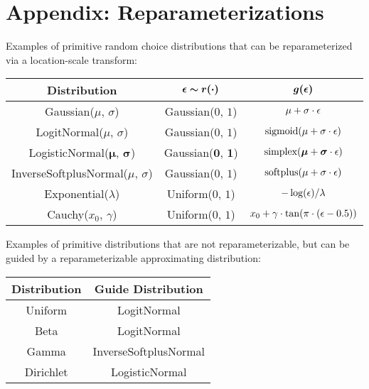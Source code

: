 \section{Appendix: Reparameterizations}
\label{sec:appendix_reparam}

Examples of primitive random choice distributions that can be reparameterized via a location-scale transform:

\begin{center}
\renewcommand{\arraystretch}{1.5}
\begin{tabular}{c | c | c}
\textbf{Distribution} & $\bm{\epsilon \sim r(\cdot)}$ & $\bm{g(\epsilon)}$ \\
\hline
Gaussian($\mu$, $\sigma$) & Gaussian($0$, $1$) & $\mu + \sigma \cdot \epsilon$ \\
LogitNormal($\mu$, $\sigma$) & Gaussian($0$, $1$) & $\text{sigmoid}(\mu + \sigma \cdot \epsilon)$ \\
LogisticNormal($\bm{\mu}$, $\bm{\sigma}$) & Gaussian($\bm{0}$, $\bm{1}$) & $\text{simplex}(\bm{\mu} + \bm{\sigma} \cdot \epsilon)$ \\
InverseSoftplusNormal($\mu$, $\sigma$) & Gaussian($0$, $1$) & $\text{softplus}(\mu + \sigma \cdot \epsilon)$ \\
Exponential($\lambda$) & Uniform($0$, $1$) & $-\log(\epsilon) / \lambda$ \\
Cauchy($x_0$, $\gamma$) & Uniform($0$, $1$) & $x_0 + \gamma \cdot \tan( \pi \cdot (\epsilon - 0.5) )$
\end{tabular}
\end{center}

Examples of primitive distributions that are not reparameterizable, but can be guided by a reparameterizable approximating distribution:

\begin{center}
\renewcommand{\arraystretch}{1.5}
\begin{tabular}{c | c}
\textbf{Distribution} & \textbf{Guide Distribution} \\
\hline
Uniform & LogitNormal \\
Beta & LogitNormal \\
Gamma & InverseSoftplusNormal \\
Dirichlet & LogisticNormal
\end{tabular}
\end{center}
